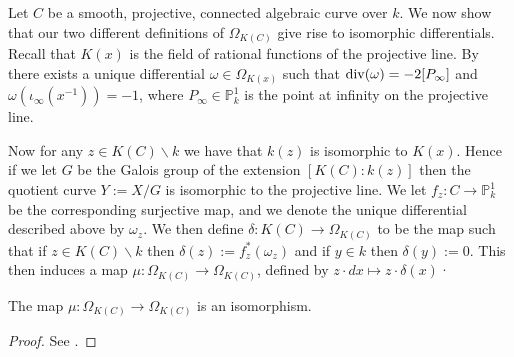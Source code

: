 \begin{comment}
We now show the equivalence of our two definitions of differential.

Recall that for a curve $C$ a derivation of $K(C)$ is a $k$-linear map $d\colon K(C) \rightarrow M$ for some $K(C)$-module $M$ such that $d(ab) = ad(b) + d(a)b$ for all $a,b\in K(C)$.
Note that of course, as $K(C)$ is a field, $M$ is a vector space, but this does hold more generally for rings and modules.

By \cite[Prop. IV.1.4]{stichtenoth}, for each $x\in K(C)\backslash k$ there exists a unique derivation $d_x\colon K(C) \rightarrow K(C)$ such that $d_x(x) = 1$, which we call the {\em derivation with respect to $x$}.

If we let $Z:= \{(u,x)\in K(C)\times K(C) |x\notin k\}$, then we can define a relation on the elements of $Z$ by letting $(u,x) \sim (v,y)$ if $v = u\cdot d_y(x)$.
Then we denote the equivalence class of $(1,x)\in Z$ by $dx$.
It can then be shown that $Z$, when quotiented by the above relation, has the univerisal property of $\Omega_C$, and hence is isomorphic to $\Omega_C$ as a $K(C)$-module (see \cite[IV.1.8]{stichtenoth}).
\end{comment}

Let $C$ be a smooth, projective, connected algebraic curve over $k$.
We now show that our two different definitions of $\Omega_{K(C)}$ give rise to isomorphic differentials.
Recall that $K(x)$ is the field of rational functions of the projective line.
By \cite[Prop. I.7.4]{stichtenoth} there exists a unique differential $\omega \in \Omega_{K(x)}$ such that $\operatorname{div} (\omega) = -2[P_{\infty}]$ and $\omega(\iota_\infty(x^{-1})) = -1$, where $P_\infty \in \mathbb P_k^1$ is the point at infinity on the projective line.


Now for any $z\in K(C) \backslash k$ we have that $k(z)$ is isomorphic to $K(x)$.
Hence if we let $G$ be the Galois group of the extension $[K(C):k(z)]$ then the quotient curve $Y:=X/G$ is isomorphic to the projective line.
We let $f_z\colon C \rightarrow \mathbb P_k^1$ be the corresponding surjective map, and we denote the unique differential described above by $\omega_z$.
We then define $\delta\colon K(C) \rightarrow \Omega_{K(C)}$ to be the map such that if $z\in K(C)\backslash k$ then $\delta (z) := f_z^*(\omega_z)$ and if $y\in k$ then $\delta(y):=0$.
This then induces a map $\mu\colon \Omega_{K(C)} \rightarrow \Omega_{K(C)}$, defined by $z\cdot dx \mapsto z\cdot \delta(x)$·

\begin{thm}
The map $\mu\colon \Omega_{K(C)} \rightarrow \Omega_{K(C)}$ is an isomorphism.
\end{thm}
\begin{proof}
See \cite[Thm. IV.3.2]{stichtenoth}.
\end{proof}

